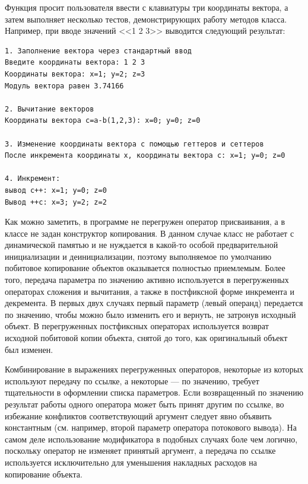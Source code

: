 Функция  просит пользователя ввести с клавиатуры три
координаты вектора, а затем выполняет несколько тестов, демонстрирующих работу методов класса. Например, при вводе
значений <<1 2 3>> выводится следующий результат:
\begin{verbatim}
1. Заполнение вектора через стандартный ввод 
Введите координаты вектора: 1 2 3 
Координаты вектора: x=1; y=2; z=3 
Модуль вектора равен 3.74166 

2. Вычитание векторов 
Координаты вектора с=a-b(1,2,3): x=0; y=0; z=0 

3. Изменение координаты вектора с помощью геттеров и сеттеров 
После инкремента координаты x, координаты вектора c: x=1; y=0; z=0 

4. Инкремент: 
вывод с++: x=1; y=0; z=0 
Вывод ++с: x=3; y=2; z=2
\end{verbatim}


Как можно заметить, в программе не перегружен оператор присваивания, а в классе
 не задан конструктор копирования. В данном случае класс не
работает с динамической памятью и не нуждается в какой-то особой предварительной инициализации и деинициализации,
поэтому выполняемое по умолчанию побитовое копирование объектов оказывается полностью приемлемым. Более того, передача
параметра по значению активно используется в перегруженных операторах сложения и вычитания, а также в постфиксной форме
инкремента и декремента. В первых двух случаях первый параметр (левый операнд) передается по значению, чтобы можно было
изменить его и вернуть, не затронув исходный объект. В перегруженных постфиксных операторах используется возврат
исходной побитовой копии объекта, снятой до того, как оригинальный объект был изменен.

Комбинирование в выражениях перегруженных операторов, некоторые из которых используют передачу по
ссылке, а некоторые --- по значению, требует тщательности в оформлении списка параметров. Если возвращенный по значению
результат работы одного оператора может быть принят другим по ссылке, во избежание конфликтов соответствующий аргумент
следует явно объявить константным (см. например, второй параметр оператора потокового вывода). На самом деле
использование модификатора  в подобных случаях боле чем логично,
поскольку оператор не изменяет принятый аргумент, а передача по ссылке используется исключительно для уменьшения
накладных расходов на копирование объекта.

